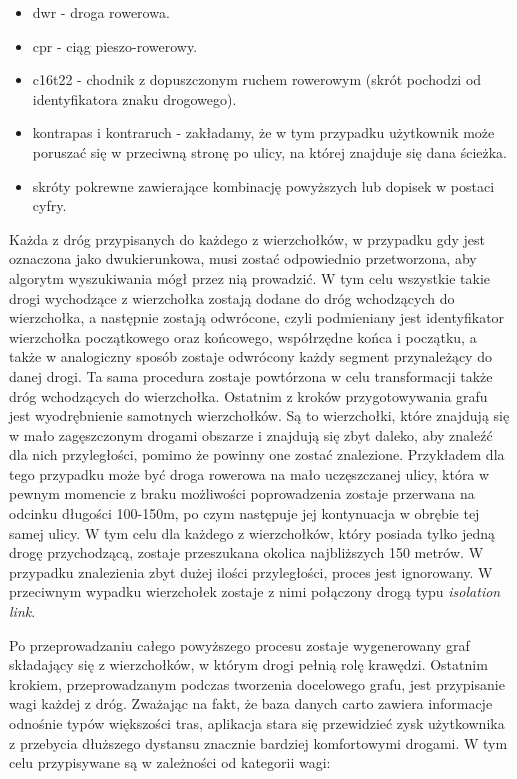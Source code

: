 \begin{itemize}
\item dwr - droga rowerowa.
\item cpr - ciąg pieszo-rowerowy.
\item c16t22 - chodnik z dopuszczonym ruchem rowerowym (skrót pochodzi od identyfikatora znaku drogowego).
\item kontrapas i kontraruch - zakładamy, że w tym przypadku użytkownik może poruszać się w przeciwną stronę po ulicy, na której znajduje się dana ścieżka.
\item skróty pokrewne zawierające kombinację powyższych lub dopisek w postaci cyfry.
\end{itemize}

Każda z dróg przypisanych do każdego z wierzchołków, w przypadku gdy jest oznaczona jako dwukierunkowa, musi zostać odpowiednio przetworzona, aby algorytm wyszukiwania mógł przez nią prowadzić. W tym celu wszystkie takie drogi wychodzące z wierzchołka zostają dodane do dróg wchodzących do wierzchołka, a następnie zostają odwrócone, czyli podmieniany jest identyfikator wierzchołka początkowego oraz końcowego, współrzędne końca i początku, a także w analogiczny sposób zostaje odwrócony każdy segment przynależący do danej drogi. Ta sama procedura zostaje powtórzona w celu transformacji także dróg wchodzących do wierzchołka.
Ostatnim z kroków przygotowywania grafu jest wyodrębnienie samotnych wierzchołków. Są to wierzchołki, które znajdują się w mało zagęszczonym drogami obszarze i znajdują się zbyt daleko, aby znaleźć dla nich przyległości, pomimo że powinny one zostać znalezione. Przykładem dla tego przypadku może być droga rowerowa na mało uczęszczanej ulicy, która w pewnym momencie z braku możliwości poprowadzenia zostaje przerwana na odcinku długości 100-150m, po czym następuje jej kontynuacja w obrębie tej samej ulicy. W tym celu dla każdego z wierzchołków, który posiada tylko jedną drogę przychodzącą, zostaje przeszukana okolica najbliższych 150 metrów. W przypadku znalezienia zbyt dużej ilości przyległości, proces jest ignorowany. W przeciwnym wypadku wierzchołek zostaje z nimi połączony drogą typu \textit{isolation link}. \newline

Po przeprowadzaniu całego powyższego procesu zostaje wygenerowany graf składający się z wierzchołków, w którym drogi pełnią rolę krawędzi. Ostatnim krokiem, przeprowadzanym podczas tworzenia docelowego grafu, jest przypisanie wagi każdej z dróg. Zważając na fakt, że baza danych carto zawiera informacje odnośnie typów większości tras, aplikacja stara się przewidzieć zysk użytkownika z przebycia dłuższego dystansu znacznie bardziej komfortowymi drogami. W tym celu przypisywane są w zależności od kategorii wagi:

